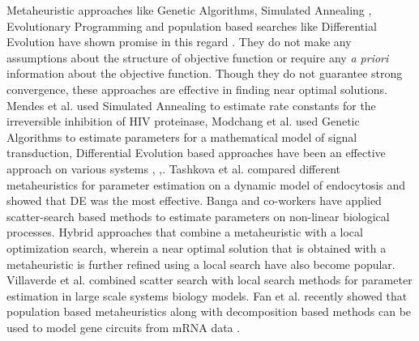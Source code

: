 \documentclass[12pt]{article}
\begin{document}
Metaheuristic approaches like Genetic Algorithms, Simulated Annealing \cite{kirkpatrick1983optimization}, Evolutionary Programming and population based searches like Differential Evolution\cite{storn1997differential} have shown promise in this regard \cite{sun2012parameter}. They do not make any assumptions about the structure of objective function or require any \textit{a priori} information about the objective function. Though they do not guarantee strong convergence, these approaches are effective in finding near optimal solutions.  Mendes et al. \cite{mendes1998non} used Simulated Annealing to estimate rate constants for the irreversible inhibition of HIV proteinase, Modchang et al. \cite {modchang2008mathematical} used Genetic Algorithms to estimate parameters for a mathematical model of signal transduction, Differential Evolution based approaches have been an effective approach on various systems \cite{tsai2005evolutionary}, \cite{wang2001hybrid},\cite{noman2007inferring}. Tashkova et al. \cite{tashkova2011parameter} compared different metaheuristics for parameter estimation on a dynamic model of endocytosis and showed that DE was the most effective. Banga and co-workers have applied scatter-search based methods \cite{villaverde2012cooperative} \cite{rodriguez2006novel} \cite{egea2007scatter} to estimate parameters on non-linear biological processes. Hybrid approaches that combine a metaheuristic with a local optimization search, wherein a near optimal solution that is obtained with a metaheuristic is further refined using a local search have also become popular. Villaverde et al. \cite{villaverde2015biopredyn} combined scatter search with local search methods for parameter estimation in large scale systems biology models. Fan et al. recently showed that population based metaheuristics along with decomposition based methods can be used to model gene circuits from mRNA data \cite{fan2015parameter}. 
\end{document}
